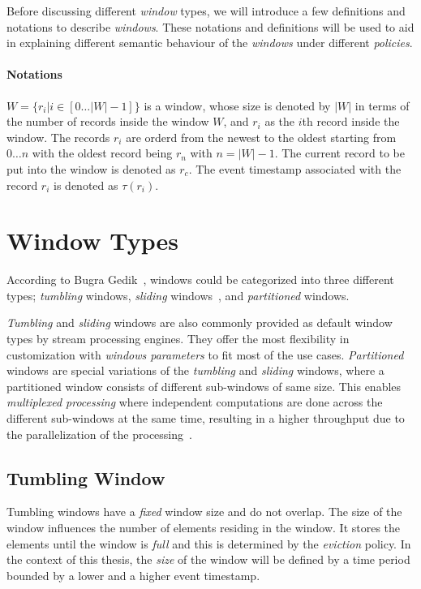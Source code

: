 Before discussing different \emph{window} types, we will introduce a 
few definitions and notations to describe \emph{windows}. These notations and definitions 
will be used to aid in explaining different semantic behaviour of the \emph{windows} under 
different \emph{policies}. 

\paragraph{Notations}%
$W = \{r_i | i \in [0\dots|W| - 1] \} $ is a window, whose size is denoted by $|W|$ in terms 
of the number of records inside the window $W$, and $r_i$ as the $i$th record inside 
the window. The records $r_i$ are orderd from the newest to the oldest starting from 
$0\dots n$ with the oldest record being $r_n$ with $ n = |W| - 1$. The current record to be put 
into the window is denoted as $r_c$. The event timestamp associated with the
record $r_i$ is denoted as $\tau(r_i)$.

\section{Window Types}

According to Bugra Gedik~\cite{generic_window_sem}, windows could be categorized into 
three different types; \emph{tumbling} windows, 
\emph{sliding} windows~\cite{stream_standford,spade_stream}, and \emph{partitioned} windows.

\emph{Tumbling} and \emph{sliding} windows are also commonly provided as 
 default window types by stream processing engines. 
They offer the most flexibility in customization with \emph{windows parameters} to fit 
most of the use cases.
\emph{Partitioned} windows are special variations of the \emph{tumbling} and
\emph{sliding} windows, where a partitioned window consists of different sub-windows of same size. 
This enables \emph{multiplexed processing} where independent computations are done across the 
different sub-windows at the same time, resulting in a higher throughput due to 
the parallelization of the processing~\cite{generic_window_sem}.

\subsection{Tumbling Window}%
\label{sec:Tumbling Window}
Tumbling windows have a \emph{fixed} window size and do not 
overlap. The size of the window influences 
the number of elements residing in the window. It stores the elements 
until the window is \emph{full} and this is determined by the \emph{eviction} policy. 
In the context of this thesis, the \emph{size} of the window will be defined by 
a time period bounded by a lower and a higher event timestamp. 

